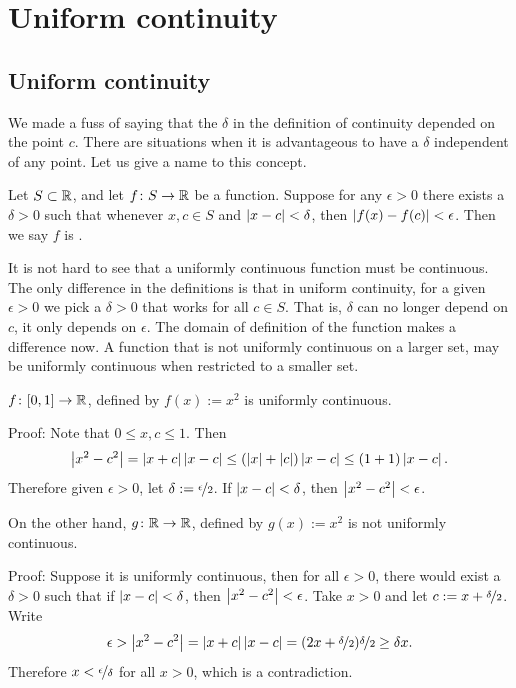 
\sectionnewpage
\section{Uniform continuity}
\label{sec:unifcont}


\subsection{Uniform continuity}

We made a fuss of saying that the $\delta$ in the definition of
continuity depended on the point $c$.  There are situations when it is
advantageous to have a $\delta$ independent of any point.  Let
us give a name to this concept.

\begin{defn}
Let $S \subset {\mathbb{R}}$, and let $f \colon S \to {\mathbb{R}}$ be a function.
Suppose for any $\epsilon > 0$ there exists a $\delta > 0$
such that whenever $x, c \in S$ and
$\left\lvert {x-c} \right\rvert < \delta$, then $\left\lvert {f(x)-f(c)} \right\rvert < \epsilon$.
Then we say $f$ is \emph{}.
\end{defn}

It is not hard to see that a uniformly continuous function
must be continuous.
The only difference in the definitions
is that in uniform continuity, for a given $\epsilon > 0$ we pick a $\delta > 0$ that
works for all $c \in S$.  That is, $\delta$ can no longer depend on $c$,
it only depends on $\epsilon$.  The domain of definition
of the function makes a difference now.  A function that is not uniformly
continuous on a larger set, may be uniformly continuous when restricted to a
smaller set.

\begin{example}
$f \colon [0,1] \to {\mathbb{R}}$, defined by $f(x) := x^2$ is uniformly continuous.

Proof: Note that $0 \leq x,c \leq 1$.  Then
\begin{equation*}
\left\lvert {x^2-c^2} \right\rvert = \left\lvert {x+c} \right\rvert\left\lvert {x-c} \right\rvert
\leq (\left\lvert {x} \right\rvert+\left\lvert {c} \right\rvert) \left\lvert {x-c} \right\rvert
\leq (1+1)\left\lvert {x-c} \right\rvert .
\end{equation*}
Therefore given $\epsilon > 0$, let $\delta := \nicefrac{\epsilon}{2}$.
If $\left\lvert {x-c} \right\rvert < \delta$, then $\left\lvert {x^2-c^2} \right\rvert < \epsilon$.

\medskip

On the other hand, $g \colon {\mathbb{R}} \to {\mathbb{R}}$, defined by $g(x) := x^2$ is not uniformly
continuous.

Proof: Suppose it is uniformly continuous, then for all $\epsilon > 0$,
there would exist a $\delta > 0$ such that
if $\left\lvert {x-c} \right\rvert < \delta$, then $\left\lvert {x^2 -c^2} \right\rvert < \epsilon$.
Take $x > 0$ and let
$c := x+\nicefrac{\delta}{2}$.  Write
\begin{equation*}
\epsilon >
\left\lvert {x^2-c^2} \right\rvert = \left\lvert {x+c} \right\rvert\left\lvert {x-c} \right\rvert
=
(2x+\nicefrac{\delta}{2})\nicefrac{\delta}{2} 
\geq 
\delta x .
\end{equation*}
Therefore $x < \nicefrac{\epsilon}{\delta}$ for all $x > 0$, which is a
contradiction.
\end{example}


